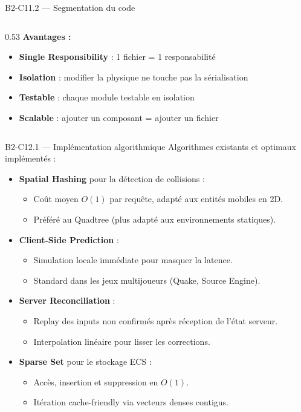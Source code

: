 \documentclass[aspectratio=169,10pt]{beamer}
\begin{document}
\begin{frame}[fragile]{B2-C11.2 — Segmentation du code}
\begin{columns}[T]
\begin{column}{0.53\textwidth}
\vspace{0.2em}
\textbf{Avantages :}
\begin{itemize}\setlength\itemsep{0pt}
  \item \textbf{Single Responsibility} : 1 fichier = 1 responsabilité
  \item \textbf{Isolation} : modifier la physique ne touche pas la sérialisation
  \item \textbf{Testable} : chaque module testable en isolation
  \item \textbf{Scalable} : ajouter un composant = ajouter un fichier
\end{itemize}
\end{column}
\end{columns}
\end{frame}

\begin{frame}{B2-C12.1 — Implémentation algorithmique}
\footnotesize
Algorithmes existants et optimaux implémentés :

\begin{itemize}\setlength\itemsep{2pt}
  \item \textbf{Spatial Hashing} pour la détection de collisions :
    \begin{itemize}\setlength\itemsep{0pt}
      \item Coût moyen $O(1)$ par requête, adapté aux entités mobiles en 2D.
      \item Préféré au Quadtree (plus adapté aux environnements statiques).
    \end{itemize}
  \item \textbf{Client-Side Prediction} :
    \begin{itemize}\setlength\itemsep{0pt}
      \item Simulation locale immédiate pour masquer la latence.
      \item Standard dans les jeux multijoueurs (Quake, Source Engine).
    \end{itemize}
  \item \textbf{Server Reconciliation} :
    \begin{itemize}\setlength\itemsep{0pt}
      \item Replay des inputs non confirmés après réception de l'état serveur.
      \item Interpolation linéaire pour lisser les corrections.
    \end{itemize}
  \item \textbf{Sparse Set} pour le stockage ECS :
    \begin{itemize}\setlength\itemsep{0pt}
      \item Accès, insertion et suppression en $O(1)$.
      \item Itération cache-friendly via vecteurs denses contigus.
    \end{itemize}
\end{itemize}
\end{frame}
\end{document}

